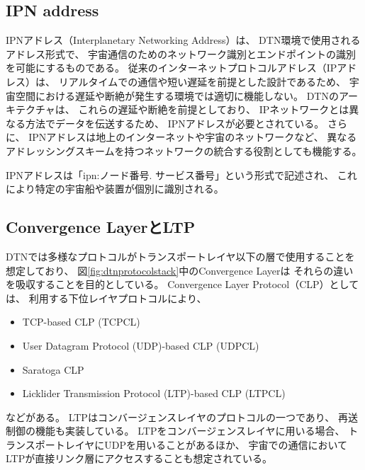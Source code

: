 \subsection{IPN address}
\label{subsection:IPN address}
IPNアドレス（Interplanetary Networking Address）は、 DTN環境で使用されるアドレス形式で、
宇宙通信のためのネットワーク識別とエンドポイントの識別を可能にするものである。 従来のインターネットプロトコルアドレス（IPアドレス）は、
リアルタイムでの通信や短い遅延を前提とした設計であるため、 宇宙空間における遅延や断絶が発生する環境では適切に機能しない。
DTNのアーキテクチャは、 これらの遅延や断絶を前提としており、 IPネットワークとは異なる方法でデータを伝送するため、
IPNアドレスが必要とされている。 さらに、 IPNアドレスは地上のインターネットや宇宙のネットワークなど、
異なるアドレッシングスキームを持つネットワークの統合する役割としても機能する。

IPNアドレスは「ipn:ノード番号. サービス番号」という形式で記述され、 これにより特定の宇宙船や装置が個別に識別される。 

\subsection{Convergence LayerとLTP}
\label{subsection:Convergence LayerとLTP}
DTNでは多様なプロトコルがトランスポートレイヤ以下の層で使用することを想定しており、 図\ref{fig:dtnprotocolstack}中のConvergence Layerは
それらの違いを吸収することを目的としている。 Convergence Layer Protocol（CLP）としては、 
利用する下位レイヤプロトコルにより、
\begin{itemize}
    \item TCP-based CLP (TCPCL)
    \item User Datagram Protocol (UDP)-based CLP (UDPCL)
    \item Saratoga CLP
    \item Licklider Transmission Protocol (LTP)-based CLP (LTPCL)
\end{itemize}
などがある。
LTP\cite{rfc5326}はコンバージェンスレイヤのプロトコルの一つであり、 再送制御の機能も実装している。
LTPをコンバージェンスレイヤに用いる場合、 トランスポートレイヤにUDPを用いることがあるほか、 
宇宙での通信においてLTPが直接リンク層にアクセスすることも想定されている。
